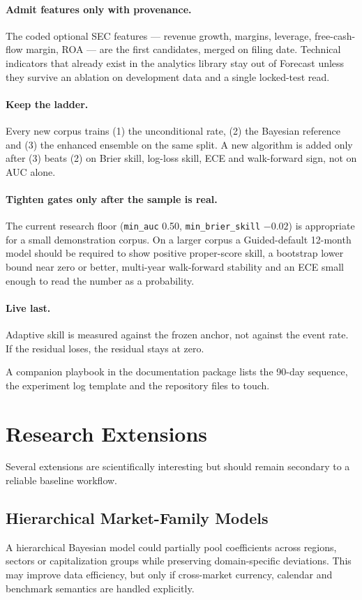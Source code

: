 \documentclass[11pt]{article}
\begin{document}
\paragraph{Admit features only with provenance.}
The coded optional SEC features --- revenue growth, margins, leverage, free-cash-flow margin, ROA --- are the first candidates, merged on filing date. Technical indicators that already exist in the analytics library stay out of Forecast unless they survive an ablation on development data and a single locked-test read.

\paragraph{Keep the ladder.}
Every new corpus trains (1) the unconditional rate, (2) the Bayesian reference and (3) the enhanced ensemble on the same split. A new algorithm is added only after (3) beats (2) on Brier skill, log-loss skill, ECE and walk-forward sign, not on AUC alone.

\paragraph{Tighten gates only after the sample is real.}
The current research floor (\texttt{min\_auc} 0.50, \texttt{min\_brier\_skill} $-0.02$) is appropriate for a small demonstration corpus. On a larger corpus a Guided-default 12-month model should be required to show positive proper-score skill, a bootstrap lower bound near zero or better, multi-year walk-forward stability and an ECE small enough to read the number as a probability.

\paragraph{Live last.}
Adaptive skill is measured against the frozen anchor, not against the event rate. If the residual loses, the residual stays at zero.

A companion playbook in the documentation package lists the 90-day sequence, the experiment log template and the repository files to touch.

\section{Research Extensions}
Several extensions are scientifically interesting but should remain secondary to a reliable baseline workflow.

\subsection{Hierarchical Market-Family Models}
A hierarchical Bayesian model could partially pool coefficients across regions, sectors or capitalization groups while preserving domain-specific deviations. This may improve data efficiency, but only if cross-market currency, calendar and benchmark semantics are handled explicitly.
\end{document}
